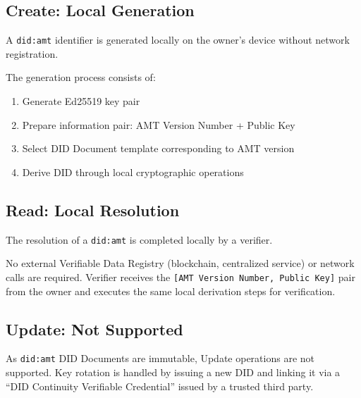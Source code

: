 \subsection{Create: Local Generation}

\begin{theorem}
  \label{thm:did-local-generation}
  A \texttt{did:amt} identifier is generated locally on the owner's device without network registration.

  The generation process consists of:
  \begin{enumerate}
    \item Generate Ed25519 key pair
    \item Prepare information pair: AMT Version Number + Public Key
    \item Select DID Document template corresponding to AMT version
    \item Derive DID through local cryptographic operations
  \end{enumerate}
  \leanok
\end{theorem}

\subsection{Read: Local Resolution}

\begin{theorem}
  \label{thm:did-local-resolution}
  The resolution of a \texttt{did:amt} is completed locally by a verifier.

  No external Verifiable Data Registry (blockchain, centralized service) or network calls are required.
  Verifier receives the \texttt{[AMT Version Number, Public Key]} pair from the owner and executes
  the same local derivation steps for verification.
  \leanok
\end{theorem}

\subsection{Update: Not Supported}

As \texttt{did:amt} DID Documents are immutable, Update operations are not supported. Key rotation is handled by issuing a new DID and linking it via a ``DID Continuity Verifiable Credential'' issued by a trusted third party.


